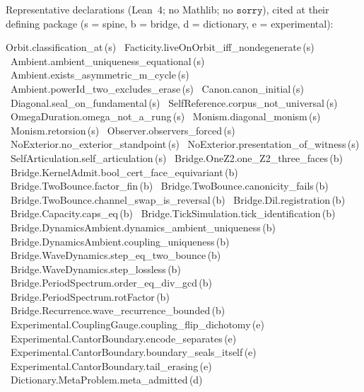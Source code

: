 \documentclass[11pt,a4paper]{article}
\theoremstyle{plain}
\theoremstyle{definition}
\theoremstyle{remark}
\begin{document}
Representative declarations (Lean~4; no Mathlib; no $\mathtt{sorry}$),
cited at their defining package (s = spine, b = bridge, d = dictionary,
e = experimental):
\begin{center}
{\small\ttfamily\raggedright
Orbit.classification\_at\,(s) \textperiodcentered\
Facticity.liveOnOrbit\_iff\_nondegenerate\,(s) \textperiodcentered\
Ambient.ambient\_uniqueness\_equational\,(s) \textperiodcentered\
Ambient.exists\_asymmetric\_m\_cycle\,(s) \textperiodcentered\
Ambient.powerId\_two\_excludes\_erase\,(s) \textperiodcentered\
Canon.canon\_initial\,(s) \textperiodcentered\
Diagonal.seal\_on\_fundamental\,(s) \textperiodcentered\
SelfReference.corpus\_not\_universal\,(s) \textperiodcentered\
OmegaDuration.\allowbreak omega\_not\_a\_rung\,(s) \textperiodcentered\
Monism.\allowbreak diagonal\_monism\,(s) \textperiodcentered\
Monism.retorsion\,(s) \textperiodcentered\
Observer.\allowbreak observers\_forced\,(s) \textperiodcentered\
NoExterior.\allowbreak no\_exterior\_standpoint\,(s) \textperiodcentered\
NoExterior.\allowbreak presentation\_of\_witness\,(s) \textperiodcentered\
SelfArticulation.\allowbreak self\_articulation\,(s) \textperiodcentered\
Bridge.OneZ2.one\_Z2\_three\_faces\,(b) \textperiodcentered\
Bridge.KernelAdmit.bool\_cert\_face\_equivariant\,(b) \textperiodcentered\
Bridge.TwoBounce.factor\_fin\,(b) \textperiodcentered\
Bridge.TwoBounce.canonicity\_fails\,(b) \textperiodcentered\
Bridge.TwoBounce.channel\_swap\_is\_reversal\,(b) \textperiodcentered\
Bridge.Dil.registration\,(b) \textperiodcentered\
Bridge.Capacity.caps\_eq\,(b) \textperiodcentered\
Bridge.TickSimulation.tick\_identification\,(b) \textperiodcentered\
Bridge.DynamicsAmbient.\allowbreak dynamics\_ambient\_uniqueness\,(b) \textperiodcentered\
Bridge.DynamicsAmbient.\allowbreak coupling\_uniqueness\,(b) \textperiodcentered\
Bridge.WaveDynamics.\allowbreak step\_eq\_two\_bounce\,(b) \textperiodcentered\
Bridge.WaveDynamics.\allowbreak step\_lossless\,(b) \textperiodcentered\
Bridge.PeriodSpectrum.\allowbreak order\_eq\_div\_gcd\,(b) \textperiodcentered\
Bridge.PeriodSpectrum.\allowbreak rotFactor\,(b) \textperiodcentered\
Bridge.Recurrence.\allowbreak wave\_recurrence\_bounded\,(b) \textperiodcentered\
Experimental.CouplingGauge.\allowbreak coupling\_flip\_dichotomy\,(e) \textperiodcentered\
Experimental.CantorBoundary.\allowbreak encode\_separates\,(e) \textperiodcentered\
Experimental.CantorBoundary.\allowbreak boundary\_seals\_itself\,(e) \textperiodcentered\
Experimental.CantorBoundary.\allowbreak tail\_erasing\,(e) \textperiodcentered\
Dictionary.MetaProblem.\allowbreak meta\_admitted\,(d)
}
\end{center}
\end{document}

